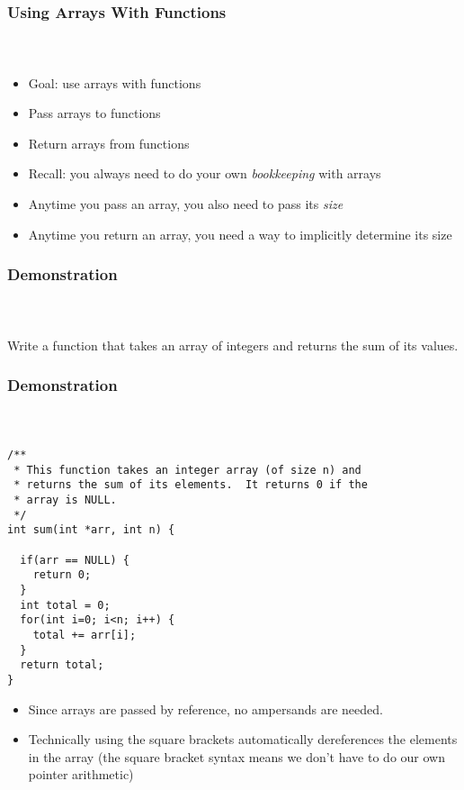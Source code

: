 \documentclass[]{beamer}
\begin{document}
\begin{frame}[fragile]
    \frametitle{Using Arrays With Functions}
    \framesubtitle{~}

\begin{itemize}[<+->]  
  \item Goal: use arrays with functions
  \item Pass arrays to functions
  \item Return arrays from functions
  \item Recall: you always need to do your own \emph{bookkeeping} with arrays
  \item Anytime you pass an array, you also need to pass its \emph{size}
  \item Anytime you return an array, you need a way to implicitly determine its size
\end{itemize}

\end{frame}

\begin{frame}[fragile]
    \frametitle{Demonstration}
    \framesubtitle{~}

Write a function that takes an array of integers and returns the
sum of its values.

\end{frame}

\begin{frame}[fragile]
    \frametitle{Demonstration}
    \framesubtitle{~}

\begin{verbatim}    
/**
 * This function takes an integer array (of size n) and
 * returns the sum of its elements.  It returns 0 if the
 * array is NULL.
 */
int sum(int *arr, int n) {

  if(arr == NULL) {
    return 0;
  }
  int total = 0;
  for(int i=0; i<n; i++) {
    total += arr[i];
  }
  return total;
}
\end{verbatim}
\begin{itemize}
  \item Since arrays are passed by reference, no ampersands are needed.
  \item Technically using the square brackets automatically dereferences the elements in the array (the square bracket syntax means we don't have to do our own pointer arithmetic)
\end{itemize}

\end{frame}
\end{document}
